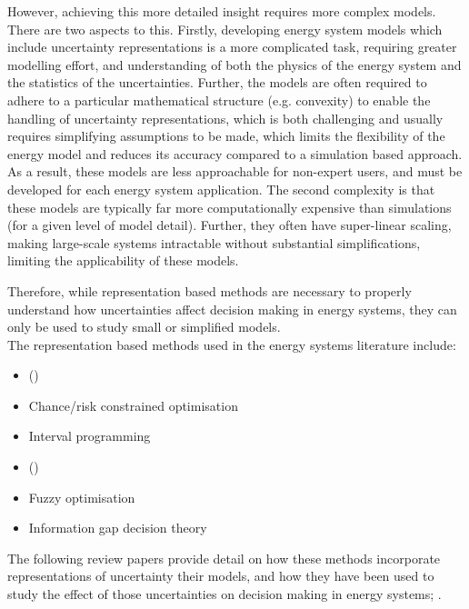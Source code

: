 However, achieving this more detailed insight requires more complex models. There are two aspects to this. Firstly, developing energy system models which include uncertainty representations is a more complicated task, requiring greater modelling effort, and understanding of both the physics of the energy system and the statistics of the uncertainties. Further, the models are often required to adhere to a particular mathematical structure (e.g. convexity) to enable the handling of uncertainty representations, which is both challenging and usually requires simplifying assumptions to be made, which limits the flexibility of the energy model and reduces its accuracy compared to a simulation based approach. As a result, these models are less approachable for non-expert users, and must be developed for each energy system application. The second complexity is that these models are typically far more computationally expensive than simulations (for a given level of model detail). Further, they often have super-linear scaling, making large-scale systems intractable without substantial simplifications, limiting the applicability of these models.

Therefore, while representation based methods are necessary to properly understand how uncertainties affect decision making in energy systems, they can only be used to study small or simplified models.\\

The representation based methods used in the energy systems literature include:

\begin{itemize}
    \item {} ()
    \item Chance/risk constrained optimisation
    \item Interval programming
    \item {} ()
    \item Fuzzy optimisation
    \item Information gap decision theory
\end{itemize}

The following review papers provide detail on how these methods incorporate representations of uncertainty their models, and how they have been used to study the effect of those uncertainties on decision making in energy systems; .\\

